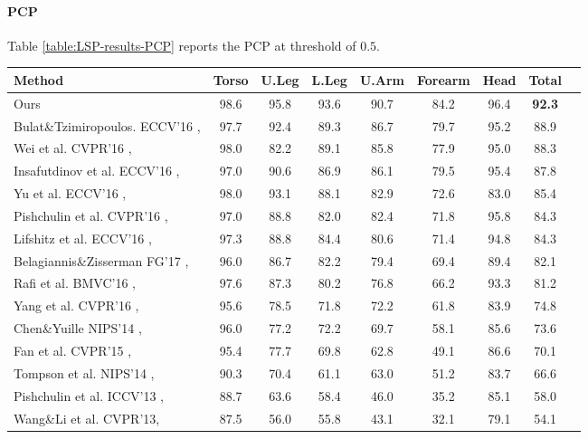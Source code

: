 \documentclass[journal ]{IEEEtran}
\begin{document}
\paragraph{PCP}
Table \ref{table:LSP-results-PCP} reports the PCP at threshold of $0.5$.
\begin{table*}[t]
	\footnotesize
	\tabcolsep=0.2cm
	\begin{center}
		\begin{tabular}{l c c c c c c c c}
			\hline 
			Method & Torso & U.Leg & L.Leg & U.Arm & Forearm & Head & Total \\ [0.2ex]
			\hline
Ours & 98.6  & 95.8  & 93.6  & 90.7  & 84.2  & 96.4 & \textbf{92.3}   \\
			\hline
			
Bulat\&Tzimiropoulos. ECCV'16 \cite{bulat2016human},  &97.7 	&92.4 	&89.3 	&86.7 	&79.7 	&95.2 	&88.9 \\
			Wei et al. CVPR'16 \cite{wei2016convolutional}, &98.0 	&82.2 	&89.1 	&85.8 	&77.9  &95.0 &88.3 \\
			Insafutdinov et al. ECCV'16 \cite{insafutdinov2016deepercut},  &97.0 	&90.6 	&86.9 	&86.1 	&79.5 	&95.4 	&87.8 \\
			Yu et al. ECCV'16 \cite{yu2016deep},  &98.0 	&93.1 	&88.1 	&82.9 	&72.6 	&83.0 	&85.4 \\
			Pishchulin et al. CVPR'16 \cite{pishchulin2016deepcut},  &97.0 	&88.8 	&82.0 	&82.4 	&71.8 	&95.8 	&84.3 \\
			Lifshitz et al. ECCV'16 \cite{lifshitz2016human}, &97.3 	&88.8 	&84.4 &80.6 	&71.4 	&94.8 	&84.3 \\
			Belagiannis\&Zisserman FG'17 \cite{belagiannis2016recurrent}, &96.0 	&86.7 	&82.2 	&79.4 	&69.4 	&89.4 	&82.1 \\
			Rafi et al. BMVC'16 \cite{rafi2016efficient},  &97.6 	&87.3 	&80.2 	&76.8 	&66.2 	&93.3 	&81.2 \\
			Yang et al. CVPR'16 \cite{yang2016end}, &95.6 	&78.5 	&71.8 	&72.2 	&61.8 	&83.9 	&74.8 \\
			Chen\&Yuille NIPS'14 \cite{chen2014articulated}, &96.0 	&77.2 	&72.2 	&69.7 	&58.1 	&85.6 	&73.6 \\
			Fan et al. CVPR'15 \cite{fan2015combining}, &95.4 	&77.7 	&69.8 	&62.8 	&49.1 	&86.6 	&70.1 \\
			Tompson et al. NIPS'14 \cite{tompson2014joint}, &90.3 	&70.4 	&61.1 	&63.0 	&51.2 	&83.7 	&66.6 \\
			Pishchulin et al. ICCV'13 \cite{pishchulin2013strong}, &88.7 	&63.6 	&58.4 	&46.0 	&35.2 	&85.1 	&58.0 \\
			Wang\&Li et al. CVPR'13\cite{fwang2013pose}, &87.5 	&56.0 	&55.8 	&43.1 	&32.1 	&79.1 	&54.1 \\
\hline
\end{tabular}
	\end{center}
	\caption{Comparisons of PCP@0.5 score on the LSP test set.}
	\label{table:LSP-results-PCP}
\end{table*}
\end{document}
